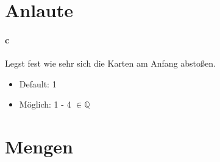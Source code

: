 \documentclass[]{article}
\begin{document}
\section{Anlaute}

	\paragraph{c} Legst fest wie sehr sich die Karten am Anfang abstoßen.
	\begin{itemize}
		\item Default: 1
		\item Möglich: 1 - 4 $\in \mathbb{Q}$
	\end{itemize}

\section{Mengen}
\end{document}
